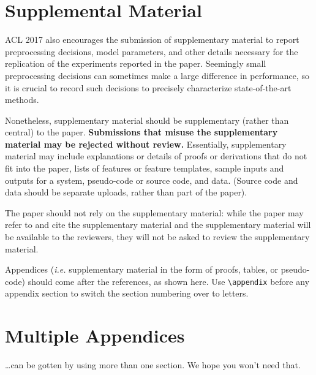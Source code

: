 \documentclass[11pt,a4paper]{article}
\begin{document}
\appendix

\section{Supplemental Material}
\label{sec:supplemental}
ACL 2017 also encourages the submission of supplementary material
to report preprocessing decisions, model parameters, and other details
necessary for the replication of the experiments reported in the 
paper. Seemingly small preprocessing decisions can sometimes make
a large difference in performance, so it is crucial to record such
decisions to precisely characterize state-of-the-art methods.

Nonetheless, supplementary material should be supplementary (rather
than central) to the paper. {\bf Submissions that misuse the supplementary 
material may be rejected without review.}
Essentially, supplementary material may include explanations or details
of proofs or derivations that do not fit into the paper, lists of
features or feature templates, sample inputs and outputs for a system,
pseudo-code or source code, and data. (Source code and data should
be separate uploads, rather than part of the paper).

The paper should not rely on the supplementary material: while the paper
may refer to and cite the supplementary material and the supplementary material will be available to the
reviewers, they will not be asked to review the
supplementary material.

Appendices ({\em i.e.} supplementary material in the form of proofs, tables,
or pseudo-code) should come after the references, as shown here. Use
\verb|\appendix| before any appendix section to switch the section
numbering over to letters.

\section{Multiple Appendices}
\dots can be gotten by using more than one section. We hope you won't
need that.
\end{document}
